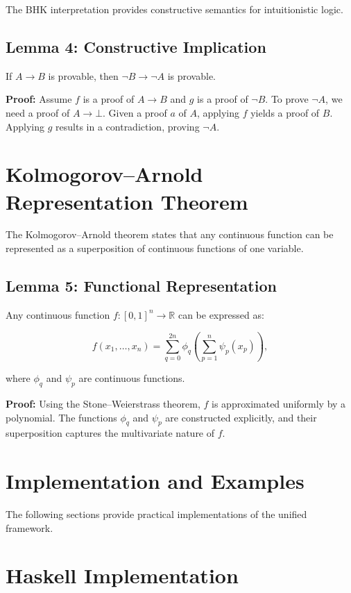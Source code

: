 \documentclass{article}
\begin{document}
The BHK interpretation provides constructive semantics for intuitionistic logic.

\subsection{Lemma 4: Constructive Implication}
If \( A \rightarrow B \) is provable, then \( \neg B \rightarrow \neg A \) is provable.

\textbf{Proof:}
Assume \( f \) is a proof of \( A \rightarrow B \) and \( g \) is a proof of \( \neg B \). To prove \( \neg A \), we need a proof of \( A \rightarrow \bot \). Given a proof \( a \) of \( A \), applying \( f \) yields a proof of \( B \). Applying \( g \) results in a contradiction, proving \( \neg A \).


\section{Kolmogorov–Arnold Representation Theorem}

The Kolmogorov–Arnold theorem states that any continuous function can be represented as a superposition of continuous functions of one variable.

\subsection{Lemma 5: Functional Representation}
Any continuous function \( f: [0, 1]^n \rightarrow \mathbb{R} \) can be expressed as:

\[
f(x_1, \dots, x_n) = \sum_{q=0}^{2n} \phi_q\left(\sum_{p=1}^{n} \psi_p(x_p)\right),
\]

where \( \phi_q \) and \( \psi_p \) are continuous functions.

\textbf{Proof:} Using the Stone–Weierstrass theorem, \( f \) is approximated uniformly by a polynomial. The functions \( \phi_q \) and \( \psi_p \) are constructed explicitly, and their superposition captures the multivariate nature of \( f \).


\section{Implementation and Examples}

The following sections provide practical implementations of the unified framework.

\section{Haskell Implementation}
\end{document}
